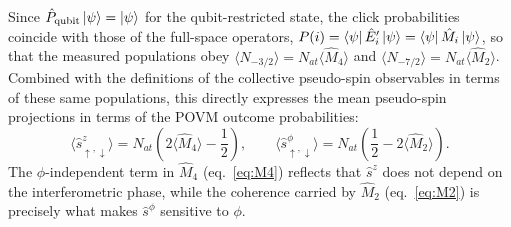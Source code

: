 Since $\hat{P}_{\text{qubit}}\ket{\psi} = \ket{\psi}$ for the qubit-restricted state, the click probabilities coincide with those of the full-space operators, $P(i) = \bra{\psi}\hat{E}_i'\ket{\psi} = \bra{\psi}\hat{M}_i\ket{\psi}$, so that the measured populations obey $\langle N_{-3/2}\rangle = N_{at}\langle \hat{M}_4\rangle$ and $\langle N_{-7/2}\rangle = N_{at}\langle \hat{M}_2\rangle$. Combined with the definitions of the collective pseudo-spin observables in terms of these same populations, this directly expresses the mean pseudo-spin projections in terms of the POVM outcome probabilities:
\begin{equation}
    \langle \hat{s}^z_{\uparrow,\downarrow} \rangle = N_{at}\left(2\langle \hat{M}_4\rangle - \frac{1}{2}\right), \qquad
    \langle \hat{s}^\phi_{\uparrow,\downarrow} \rangle = N_{at}\left(\frac{1}{2} - 2\langle \hat{M}_2\rangle\right).
\end{equation}
The $\phi$-independent term in $\hat{M}_4$ (eq.~\eqref{eq:M4}) reflects that $\hat s^z$ does not depend on the interferometric phase, while the coherence carried by $\hat{M}_2$ (eq.~\eqref{eq:M2}) is precisely what makes $\hat s^\phi$ sensitive to $\phi$.

